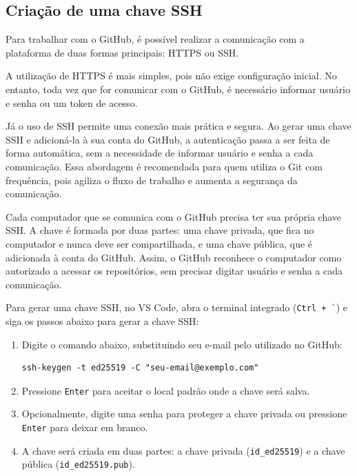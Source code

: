 \begin{enumerate}
\end{enumerate}

\subsection{Criação de uma chave SSH}
\label{cap:criacao_chave_ssh}

Para trabalhar com o GitHub, é possível realizar a comunicação com a plataforma de duas formas principais: HTTPS ou SSH.

A utilização de HTTPS é mais simples, pois não exige configuração inicial. No entanto, toda vez que for comunicar com o GitHub, é necessário informar usuário e senha ou um token de acesso.

Já o uso de SSH permite uma conexão mais prática e segura. Ao gerar uma chave SSH e adicioná-la à sua conta do GitHub, a autenticação passa a ser feita de forma automática, sem a necessidade de informar usuário e senha a cada comunicação. Essa abordagem é recomendada para quem utiliza o Git com frequência, pois agiliza o fluxo de trabalho e aumenta a segurança da comunicação.

Cada computador que se comunica com o GitHub precisa ter sua própria chave SSH. A chave é formada por duas partes: uma chave privada, que fica no computador e nunca deve ser compartilhada, e uma chave pública, que é adicionada à conta do GitHub. Assim, o GitHub reconhece o computador como autorizado a acessar os repositórios, sem precisar digitar usuário e senha a cada comunicação.

Para gerar uma chave SSH, no VS Code, abra o terminal integrado (\texttt{Ctrl + \`}) e siga os passos abaixo para gerar a chave SSH:

\begin{enumerate}
    \item Digite o comando abaixo, substituindo seu e-mail pelo utilizado no GitHub:
    \begin{lstlisting}[style=shellstyle]
ssh-keygen -t ed25519 -C "seu-email@exemplo.com"
    \end{lstlisting}
    \item Pressione \texttt{Enter} para aceitar o local padrão onde a chave será salva.
    \item Opcionalmente, digite uma senha para proteger a chave privada ou pressione \texttt{Enter} para deixar em branco.
    \item A chave será criada em duas partes: a chave privada (\texttt{id\_ed25519}) e a chave pública (\texttt{id\_ed25519.pub}).
\end{enumerate}

